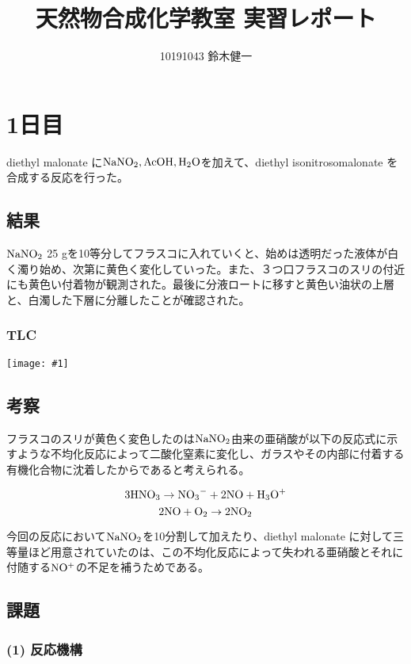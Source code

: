 \documentclass[a4paper,papersize,dvipdfmx]{jsarticle}
\newcommand{\pict}[2]{\begin{center} \texttt{[image: \#1]} \end{center}}   %
\begin{document}
\title{天然物合成化学教室 実習レポート}
\author{10191043 鈴木健一}
\date{}
\maketitle


\section*{1日目}
diethyl malonate に$\rm{NaNO_2, AcOH, H_2O}$を加えて、diethyl isonitrosomalonate を合成する反応を行った。


\subsection*{結果}
$\rm NaNO_2$ 25 gを10等分してフラスコに入れていくと、始めは透明だった液体が白く濁り始め、次第に黄色く変化していった。また、３つ口フラスコのスリの付近にも黄色い付着物が観測された。最後に分液ロートに移すと黄色い油状の上層と、白濁した下層に分離したことが確認された。

\subsubsection*{TLC}

\pict{imgs1/tlc.jpeg}{6}

\subsection*{考察}

フラスコのスリが黄色く変色したのは$\rm NaNO_2$由来の亜硝酸が以下の反応式に示すような不均化反応によって二酸化窒素に変化し、ガラスやその内部に付着する有機化合物に沈着したからであると考えられる。

\[\rm 3HNO_3 \rightarrow N{O_3}^- + 2NO + H_3O^+\]
\[\rm 2NO + O_2 \rightarrow 2NO_2\]

今回の反応において$\rm NaNO_2$を10分割して加えたり、diethyl malonate に対して三等量ほど用意されていたのは、この不均化反応によって失われる亜硝酸とそれに付随する$\rm NO^+$の不足を補うためである。

\subsection*{課題}
\subsubsection*{(1) 反応機構}
\end{document}
